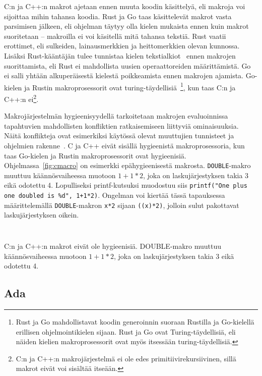 C:n ja C++:n makrot ajetaan ennen muuta koodin käsittelyä, eli makroja voi
sijoittaa mihin tahansa koodia. Rust ja Go taas käsittelevät makrot vasta
parsimisen jälkeen, eli ohjelman täytyy olla kielen mukaista ennen kuin makrot
suoritetaan -- makroilla ei voi käsitellä mitä tahansa tekstiä. Rust vaatii
erottimet, eli sulkeiden, lainausmerkkien ja heittomerkkien olevan kunnossa.
Lisäksi Rust-kääntäjän tulee tunnistaa kielen tekstialkiot~
ennen makrojen suorittamista, eli Rust ei mahdollista uusien operaattoreiden
määrittämistä. Go ei salli yhtään alkuperäisestä kielestä poikkeamista ennen
makrojen ajamista. Go-kielen ja Rustin makroprosessorit ovat
turing-täydellisiä~\citep{rustmacros, gogenerate}\footnote{Rust ja Go
mahdollistavat koodin generoinnin suoraan Rustilla ja Go-kielellä erillisen
ohjelmointikielen sijaan. Rust ja Go ovat Turing-täydellisiä, eli näiden
kielien makroprosessorit ovat myös itsessään turing-täydellisiä.}, kun taas C:n
ja C++:n ei\footnote{C:n ja C++:n makrojärjestelmä ei ole edes
primitiivirekursiivinen, sillä makrot eivät voi sisältää itseään.}. 

Makrojärjestelmän hygieenisyydellä tarkoitetaan makrojen evaluoinnissa
tapahtuvien mahdollisten konfliktien ratkaisemiseen liittyviä ominaisuuksia.
Näitä konflikteja ovat esimerkiksi käytössä olevat muuttujien tunnisteet ja
ohjelmien rakenne~\citep{macrohygiene}. C ja C++ eivät sisällä hygieenistä
makroprosessoria, kun taas Go-kielen ja Rustin makroprosessorit ovat
hygieenisiä. Ohjelmassa~\ref{fig:cmacro} on esimerkki epähygieenisestä
makrosta. \texttt{DOUBLE}-makro muuttuu käännösvaiheessa muotoon $1+1*2$, joka
on laskujärjestyksen takia 3 eikä odotettu 4. Lopulliseksi printf-kutsuksi
muodostuu siis \texttt{printf("One plus one doubled is \%d", 1+1*2)}. Ongelman
voi kiertää tässä tapauksessa määrittelemällä \texttt{DOUBLE}-makron
\texttt{x*2} sijaan \texttt{((x)*2)}, jolloin sulut pakottavat
laskujärjestyksen oikein.

\FloatBarrier

\begin{listing}[ht!]
    \inputminted{C}{c-hygiene.c}
    \inputminted{text}{c-hygiene-output.txt}
    \caption{C:n ja C++:n makrot eivät ole hygieenisiä. DOUBLE-makro muuttuu
    käännösvaiheessa muotoon $1+1*2$, joka on laskujärjestyksen takia 3 eikä
    odotettu 4.}
    \label{fig:cmacro}
\end{listing}

\FloatBarrier

\subsection{Ada}

